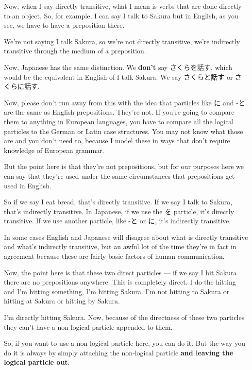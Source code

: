 Now, when I say directly transitive, what I mean is verbs that are done directly to an object. So, for example, I can say I talk to Sakura but in English, as you see, we have to have a preposition there.

{}

We're not saying I talk Sakura, so we're not directly transitive, we're indirectly transitive through the medium of a preposition.

Now, Japanese has the same distinction. We {\bf don't} say さくらを話す, which would be the equivalent in English of I talk Sakura. We say さくらと話す or さくらに話す.

{}

Now, please don't run away from this with the idea that particles like に and -と are the same as English prepositions. They're not. If you're going to compare them to anything in European languages, you have to compare all the logical particles to the German or Latin case structures. You may not know what those are and you don't need to, because I model these in ways that don't require knowledge of European grammar.

But the point here is that they're not prepositions, but for our purposes here we can say that they're used under the same circumstances that prepositions get used in English.

So if we say I eat bread, that's directly transitive. If we say I talk to Sakura, that's indirectly transitive. In Japanese, if we use the を particle, it's directly transitive. If we use another particle, like -と or に, it's indirectly transitive.

In some cases English and Japanese will disagree about what is directly transitive and what's indirectly transitive, but an awful lot of the time they're in fact in agreement because these are fairly basic factors of human communication.

\thinrule

Now, the point here is that these two direct particles --- if we say I hit Sakura there are no prepositions anywhere. This is completely direct. I do the hitting and I'm hitting something, I'm hitting Sakura. I'm not hitting to Sakura or hitting at Sakura or hitting by Sakura.

I'm directly hitting Sakura. Now, because of the directness of these two particles they can't have a non-logical particle appended to them.

So, if you want to use a non-logical particle here, you can do it. But the way you do it is always by simply attaching the non-logical particle {\bf and leaving the logical particle out}.

